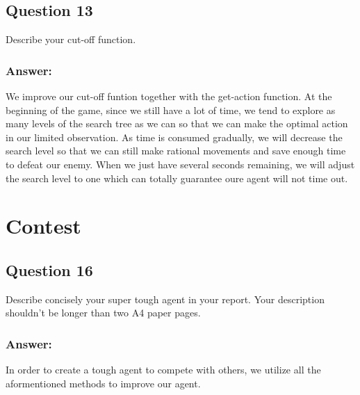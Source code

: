 \documentclass[12pt, a4paper]{report}
\begin{document}
\subsection{Question 13}
Describe your cut-off function.
\subsubsection{Answer:}
We improve our cut-off funtion together with the get-action function. At the beginning of the game, since we still have a lot of time, we tend to explore as many levels of the search tree as we can so that we can make the optimal action in our limited observation. As time is consumed gradually, we will decrease the search level so that we can still make rational movements and save enough time to defeat our enemy. When we just have several seconds remaining, we will adjust the search level to one which can totally guarantee oure agent will not time out.

\section{Contest}
\subsection{Question 16}
Describe concisely your super tough agent in your report. Your description shouldn’t be longer than two A4 paper pages.
\subsubsection{Answer:}
In order to create a tough agent to compete with others, we utilize all the aformentioned methods to improve our agent.
\end{document}
